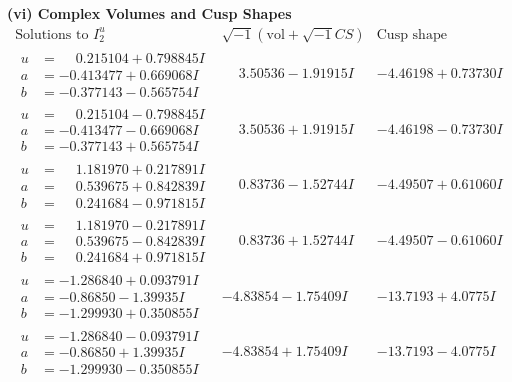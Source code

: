 \documentclass[1p]{elsarticle_modified}
\theoremstyle{definition}
\newcommand{\I}{\sqrt{-1}}
\begin{document}
\newpage\flushleft \textbf{(vi) Complex Volumes and Cusp Shapes}
$$\begin{array}{c|c|c}  
\text{Solutions to }I^u_{2}& \I (\text{vol} + \sqrt{-1}CS) & \text{Cusp shape}\\
 \hline 
\begin{aligned}
u &= \phantom{-}0.215104 + 0.798845 I \\
a &= -0.413477 + 0.669068 I \\
b &= -0.377143 - 0.565754 I\end{aligned}
 & \phantom{-}3.50536 - 1.91915 I & -4.46198 + 0.73730 I \\ \hline\begin{aligned}
u &= \phantom{-}0.215104 - 0.798845 I \\
a &= -0.413477 - 0.669068 I \\
b &= -0.377143 + 0.565754 I\end{aligned}
 & \phantom{-}3.50536 + 1.91915 I & -4.46198 - 0.73730 I \\ \hline\begin{aligned}
u &= \phantom{-}1.181970 + 0.217891 I \\
a &= \phantom{-}0.539675 + 0.842839 I \\
b &= \phantom{-}0.241684 - 0.971815 I\end{aligned}
 & \phantom{-}0.83736 - 1.52744 I & -4.49507 + 0.61060 I \\ \hline\begin{aligned}
u &= \phantom{-}1.181970 - 0.217891 I \\
a &= \phantom{-}0.539675 - 0.842839 I \\
b &= \phantom{-}0.241684 + 0.971815 I\end{aligned}
 & \phantom{-}0.83736 + 1.52744 I & -4.49507 - 0.61060 I \\ \hline\begin{aligned}
u &= -1.286840 + 0.093791 I \\
a &= -0.86850 - 1.39935 I \\
b &= -1.299930 + 0.350855 I\end{aligned}
 & -4.83854 - 1.75409 I & -13.7193 + 4.0775 I \\ \hline\begin{aligned}
u &= -1.286840 - 0.093791 I \\
a &= -0.86850 + 1.39935 I \\
b &= -1.299930 - 0.350855 I\end{aligned}
 & -4.83854 + 1.75409 I & -13.7193 - 4.0775 I \\ \hline\begin{aligned}

\end{aligned}
\end{array}$$
\end{document}
